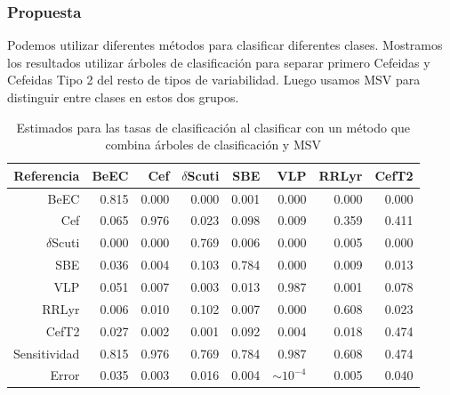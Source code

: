 \documentclass{beamer}
\begin{document}
\begin{frame}
\frametitle{Propuesta}
Podemos utilizar diferentes métodos para clasificar diferentes clases. Mostramos los resultados utilizar árboles de clasificación para separar primero Cefeidas y Cefeidas Tipo 2 del resto de tipos de variabilidad. Luego usamos MSV para distinguir entre clases en estos dos grupos.
\begin{table}[ht]
  \centering
  \resizebox{0.7\textwidth}{!} {
    \begin{tabular}{rrrrrrrr}
      \hline
      Referencia & BeEC & Cef & $\delta$Scuti & SBE & VLP & RRLyr & CefT2 \\ 
      \hline
      BeEC & 0.815 & 0.000 & 0.000 & 0.001 & 0.000 & 0.000 & 0.000 \\ 
      Cef & 0.065 & 0.976 & 0.023 & 0.098 & 0.009 & 0.359 & 0.411 \\ 
      $\delta$Scuti & 0.000 & 0.000 & 0.769 & 0.006 & 0.000 & 0.005 & 0.000 \\ 
      SBE & 0.036 & 0.004 & 0.103 & 0.784 & 0.000 & 0.009 & 0.013 \\ 
      VLP & 0.051 & 0.007 & 0.003 & 0.013 & 0.987 & 0.001 & 0.078 \\ 
      RRLyr & 0.006 & 0.010 & 0.102 & 0.007 & 0.000 & 0.608 & 0.023 \\ 
      CefT2 & 0.027 & 0.002 & 0.001 & 0.092 & 0.004 & 0.018 & 0.474 \\  
      \hline
      Sensitividad & 0.815 & 0.976 & 0.769 & 0.784 & 0.987 & 0.608 & 0.474 \\ 
      \hline
      Error & 0.035 & 0.003 & 0.016 & 0.004 & $\sim 10^{-4}$ & 0.005 & 0.040 \\ 
      \hline
    \end{tabular}
  }
  \caption{Estimados para las tasas de clasificación al clasificar con un método que combina árboles de clasificación y MSV }
  \label{cuadro:clasificadorriollo}
\end{table} 

\end{frame}
\end{document}
